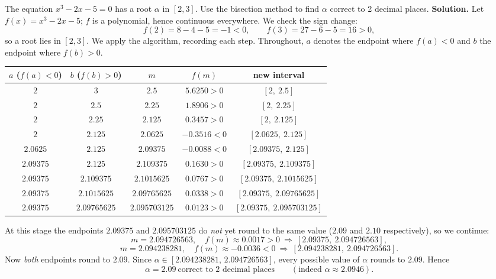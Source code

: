 \documentclass[11pt]{article}
\begin{document}
\begin{exoresolu}[Solving $x^3-2x-5=0$ by bisection, to 2 decimal places]
The equation $x^3-2x-5=0$ has a root $\alpha$ in $[2,3]$. Use the bisection method to find $\alpha$ correct to 2 decimal places.
\tcblower
\textbf{Solution.} Let $f(x)=x^3-2x-5$; $f$ is a polynomial, hence continuous everywhere. We check the sign change:
\[ f(2)=8-4-5=-1<0, \qquad f(3)=27-6-5=16>0, \]
so a root lies in $[2,3]$. We apply the algorithm, recording each step. Throughout, $a$ denotes the endpoint where $f(a)<0$ and $b$ the endpoint where $f(b)>0$.

\begin{center}
\begin{tabular}{|c|c|c|c|c|}
\hline
\rowcolor{popblueL} $a$ ($f(a)<0$) & $b$ ($f(b)>0$) & $m$ & $f(m)$ & new interval \\
\hline
$2$ & $3$ & $2.5$ & $5.6250>0$ & $[2,\ 2.5]$ \\
\hline
$2$ & $2.5$ & $2.25$ & $1.8906>0$ & $[2,\ 2.25]$ \\
\hline
$2$ & $2.25$ & $2.125$ & $0.3457>0$ & $[2,\ 2.125]$ \\
\hline
$2$ & $2.125$ & $2.0625$ & $-0.3516<0$ & $[2.0625,\ 2.125]$ \\
\hline
$2.0625$ & $2.125$ & $2.09375$ & $-0.0088<0$ & $[2.09375,\ 2.125]$ \\
\hline
$2.09375$ & $2.125$ & $2.109375$ & $0.1630>0$ & $[2.09375,\ 2.109375]$ \\
\hline
$2.09375$ & $2.109375$ & $2.1015625$ & $0.0767>0$ & $[2.09375,\ 2.1015625]$ \\
\hline
$2.09375$ & $2.1015625$ & $2.09765625$ & $0.0338>0$ & $[2.09375,\ 2.09765625]$ \\
\hline
$2.09375$ & $2.09765625$ & $2.095703125$ & $0.0123>0$ & $[2.09375,\ 2.095703125]$ \\
\hline
\end{tabular}
\end{center}

At this stage the endpoints $2.09375$ and $2.095703125$ do \emph{not} yet round to the same value ($2.09$ and $2.10$ respectively), so we continue:
\[ m=2.094726563,\quad f(m)\approx 0.0017>0 \ \Rightarrow\ [2.09375,\ 2.094726563], \]
\[ m=2.094238281,\quad f(m)\approx -0.0036<0 \ \Rightarrow\ [2.094238281,\ 2.094726563]. \]
Now \emph{both} endpoints round to $2.09$. Since $\alpha\in[2.094238281,\,2.094726563]$, every possible value of $\alpha$ rounds to $2.09$. Hence
\[ \boxed{\alpha = 2.09 \ \text{correct to 2 decimal places}} \qquad (\text{indeed } \alpha \approx 2.0946). \]
\end{exoresolu}
\end{document}
